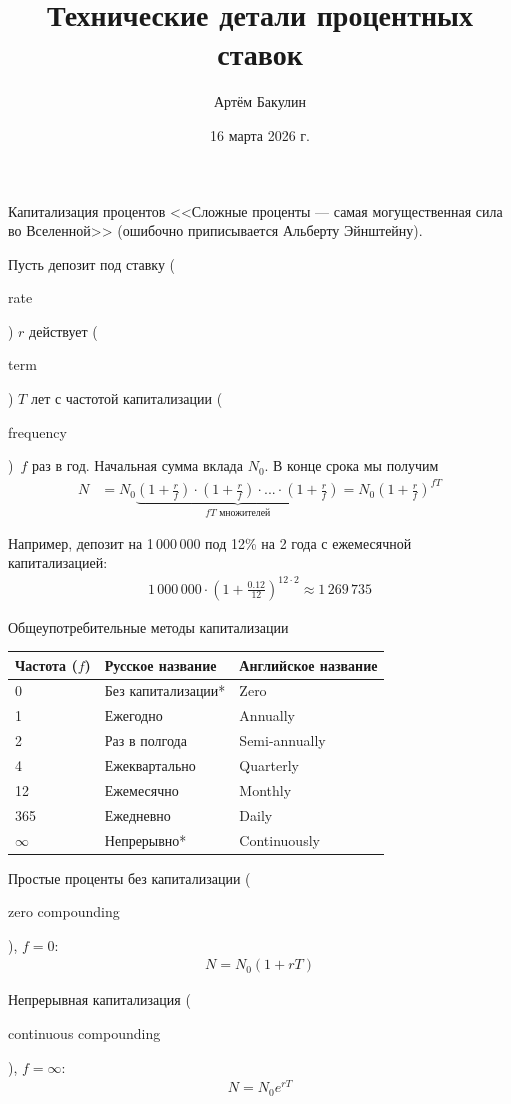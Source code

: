 \documentclass{beamer}
\title{Технические детали процентных ставок}
\author{Артём Бакулин}
\date{16 марта 2026 г.}
\newcommand{\en}[1]{\begin{otherlanguage}{english}#1\end{otherlanguage}}
\begin{document}
\begin{frame}
\titlepage
\end{frame}

\begin{frame}{Капитализация процентов}
\justify
<<Сложные проценты --- самая могущественная сила во Вселенной>> 
(ошибочно приписывается Альберту Эйнштейну).

\justify
Пусть депозит под ставку (\en{rate}) $r$ действует (\en{term}) $T$ лет с 
частотой капитализации (\en{frequency})\ $f$ раз в год. Начальная сумма вклада 
$N_0$. В конце срока мы получим
\begin{align*}
N &= N_0\underbrace{\left(1 + \frac{r}{f}\right) \cdot \left(1 + \frac{r}{f}\right) \cdot ... \cdot \left(1 + \frac{r}{f}\right)}_{fT \text{\ множителей}} = 
N_0\left(1 + \frac{r}{f}\right)^{fT}
\end{align*}

Например, депозит на 1\,000\,000 под 12\% на 2 года с ежемесячной капитализацией:
\begin{align*}
1\,000\,000 \cdot \left(1 + \frac{0.12}{12}\right)^{12 \cdot 2} \approx 1\,269\,735
\end{align*}
\end{frame}



\begin{frame}{Общеупотребительные методы капитализации}
\centering
\begin{tabular}{l|l|l}
Частота ($f$) & Русское название & Английское название \\ \hline 
0 & Без капитализации* & Zero \\
1 & Ежегодно & Annually \\
2 & Раз в полгода & Semi-annually \\
4 & Ежеквартально & Quarterly \\
12 & Ежемесячно & Monthly \\
365 & Ежедневно & Daily \\
$\infty$ & Непрерывно* & Continuously 
\end{tabular}

\justify
Простые проценты без капитализации (\en{zero compounding}), $f=0$:
\begin{align*}
N = N_0 (1 + rT)
\end{align*}

Непрерывная капитализация (\en{continuous compounding}), $f=\infty$:
\begin{align*}
N = N_0e^{rT}
\end{align*}
\end{frame}
\end{document}
